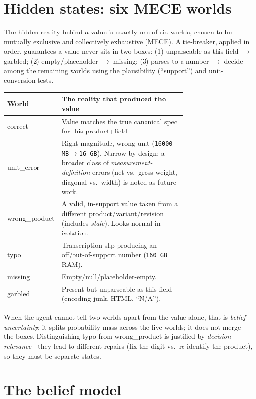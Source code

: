 \documentclass[11pt]{article}
\begin{document}
\section{Hidden states: six MECE worlds}
\label{sec:worlds}

The hidden reality behind a value is exactly one of six worlds, chosen to be
mutually exclusive and collectively exhaustive (MECE). A tie-breaker, applied in
order, guarantees a value never sits in two boxes: (1) unparseable as this field
$\rightarrow$ \textsf{garbled}; (2) empty/placeholder $\rightarrow$ \textsf{missing};
(3) parses to a number $\rightarrow$ decide among the remaining worlds using the
plausibility (``support'') and unit-conversion tests.

\begin{center}
\begin{tabular}{@{}l p{0.72\linewidth}@{}}
\toprule
\textbf{World} & \textbf{The reality that produced the value} \\
\midrule
\textsf{correct} & Value matches the true canonical spec for this product+field. \\
\textsf{unit\_error} & Right magnitude, wrong unit (\texttt{16000\,MB}$\to$\texttt{16\,GB}). Narrow by design; a broader class of \emph{measurement-definition} errors (net vs.\ gross weight, diagonal vs.\ width) is noted as future work. \\
\textsf{wrong\_product} & A valid, in-support value taken from a different product/variant/revision (includes \emph{stale}). Looks normal in isolation. \\
\textsf{typo} & Transcription slip producing an off/out-of-support number (\texttt{160\,GB} RAM). \\
\textsf{missing} & Empty/null/placeholder-empty. \\
\textsf{garbled} & Present but unparseable as this field (encoding junk, HTML, ``N/A''). \\
\bottomrule
\end{tabular}
\end{center}

\noindent
When the agent cannot tell two worlds apart from the value alone, that is
\emph{belief uncertainty}: it splits probability mass across the live worlds; it does
not merge the boxes. Distinguishing \textsf{typo} from \textsf{wrong\_product} is
justified by \emph{decision relevance}---they lead to different repairs (fix the digit
vs.\ re-identify the product), so they must be separate states.

\section{The belief model}
\label{sec:belief}
\end{document}
